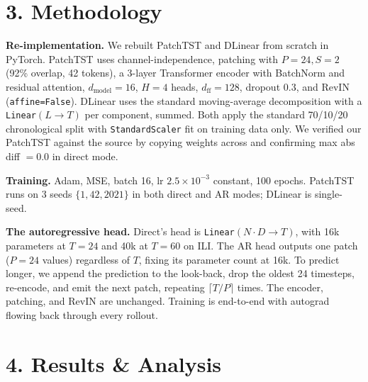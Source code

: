 \documentclass[11pt]{article}
\begin{document}
\section*{3. Methodology}
\textbf{Re-implementation.} We rebuilt PatchTST and DLinear from scratch in PyTorch. PatchTST uses channel-independence, patching with $P{=}24, S{=}2$ (92\% overlap, 42 tokens), a 3-layer Transformer encoder with BatchNorm and residual attention, $d_{\text{model}}{=}16$, $H{=}4$ heads, $d_{\text{ff}}{=}128$, dropout 0.3, and RevIN (\texttt{affine{=}False}). DLinear uses the standard moving-average decomposition with a \texttt{Linear}$(L \to T)$ per component, summed. Both apply the standard 70/10/20 chronological split with \texttt{StandardScaler} fit on training data only. We verified our PatchTST against the source by copying weights across and confirming max abs diff $= 0.0$ in direct mode.

\textbf{Training.} Adam, MSE, batch 16, lr $2.5\!\times\!10^{-3}$ constant, 100 epochs. PatchTST runs on 3 seeds $\{1, 42, 2021\}$ in both direct and AR modes; DLinear is single-seed.

\textbf{The autoregressive head.} Direct's head is \texttt{Linear}$(N{\cdot}D \to T)$, with 16k parameters at $T{=}24$ and 40k at $T{=}60$ on ILI. The AR head outputs one patch ($P{=}24$ values) regardless of $T$, fixing its parameter count at 16k. To predict longer, we append the prediction to the look-back, drop the oldest 24 timesteps, re-encode, and emit the next patch, repeating $\lceil T/P \rceil$ times. The encoder, patching, and RevIN are unchanged. Training is end-to-end with autograd flowing back through every rollout.

\section*{4. Results \& Analysis}
\end{document}
